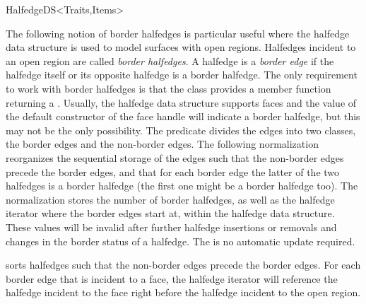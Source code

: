 \begin{ccRefConcept}{HalfedgeDS<Traits,Items>}
\ccGlue
{}
\ccGlue
{}
\ccGlue
\ccMethod{void faces_erase( Face_handle first, Face_handle last);}{
    removes the range of faces $[\ccc{first},\ccc{last})$ if faces are 
    supported and \ccc{Supports_removal} $\equiv$ \ccc{CGAL::Tag_true}.}



\begin{ccAdvanced}
  
The following notion of border halfedges is particular useful where
the halfedge data structure is used to model surfaces with open
regions.  Halfedges incident to an open region are called {\em
  border halfedges}. A halfedge is a {\em border edge\/} if the
halfedge itself or its opposite halfedge is a border halfedge. The
only requirement to work with border halfedges is that the
 class provides a member function 
returning a . Usually, the halfedge data structure
supports faces and the value of the default constructor of the face
handle will indicate a border halfedge, but this may not be the only
possibility. The  predicate divides the edges into
two classes, the border edges and the non-border edges. The
following normalization reorganizes the sequential storage of the
edges such that the non-border edges precede the border edges, and
that for each border edge the latter of the two halfedges is a
border halfedge (the first one might be a border halfedge too). The
normalization stores the number of border halfedges, as well as the
halfedge iterator where the border edges start at, within the
halfedge data structure.  These values will be invalid after further
halfedge insertions or removals and changes in the border status of 
a halfedge. The is no automatic update required.


    {sorts halfedges such that the non-border edges precede the
     border edges. For each border edge that is incident to a face,
     the halfedge iterator will reference the halfedge incident to the
     face right before the halfedge incident to the open region.}


\end{ccAdvanced}
\end{ccRefConcept}
